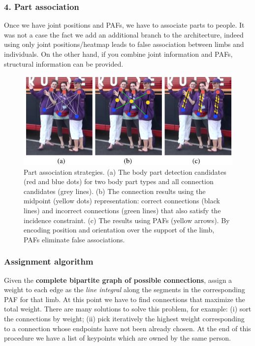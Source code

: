 \subsubsection{4. Part association}
Once we have joint positions and PAFs, we have to associate parts to people. It was not a case the fact we add an additional branch to the architecture, indeed using only joint positions/heatmap leads to false association between limbs and individuals. On the other hand, if you combine joint information and PAFs, structural information can be provided.

\begin{figure}[h]
    \centering
    \includegraphics[scale=0.9]{img/OpenPose3.png}
    \caption{Part association strategies. (a) The body part detection candidates (red and blue dots) for two body part types and all connection candidates (grey lines). (b) The connection results using the midpoint (yellow dots) representation: correct connections (black lines) and incorrect connections (green lines) that also satisfy the incidence constraint. (c) The results using PAFs (yellow arrows). By encoding position and orientation over the support of the limb, PAFs eliminate false associations.}    
\end{figure}

\subsubsection*{Assignment algorithm}
Given the \textbf{complete bipartite graph of possible connections}, assign a weight to each edge as the \textit{line integral} along the segments in the corresponding PAF for that limb. At this point we have to find connections that maximize the total weight. There are many solutions to solve this problem, for example: (i) sort the connections by weight; (ii) pick iteratively the highest weight corresponding to a connection whose endpoints have not been already chosen. At the end of this procedure we have a list of keypoints which are owned by the same person.

